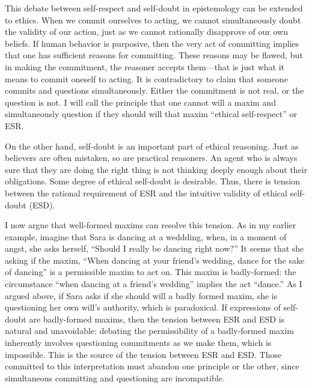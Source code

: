 \begin{isabellebody}
\begin{isamarkuptext}
This debate between self-respect and self-doubt in epistemology can be extended to ethics. When we 
commit ourselves to acting, we cannot simultaneously doubt the validity of our action, just as we cannot
rationally disapprove of our own beliefs. If human 
behavior is purposive, then the very act of committing implies that one has sufficient reasons for 
committing. These reasons may be flawed, but in making the commitment, the reasoner accepts them—that is 
just what it means to commit oneself to acting. It 
is contradictory to claim that someone commits and questions simultaneously. Either the commitment 
is not real, or the question is not. I will call the principle that one cannot will a maxim and 
simultaneously question if they should will that maxim ``ethical self-respect'' or ESR.

On the other hand, self-doubt is an important part of ethical reasoning. Just as believers are often 
mistaken, so are practical reasoners. An agent who is always sure that they are doing the right thing 
is not thinking deeply enough about their obligations. Some degree of ethical self-doubt is desirable. 
Thus, there is tension between the rational requirement of ESR and the intuitive validity of ethical 
self-doubt (ESD).

I now argue that well-formed maxims can resolve this tension. As in my earlier example, imagine that Sara is dancing at a 
weddding, when, in a moment of angst, she asks herself, ``Should I really be dancing right now?'' 
It seems that she asking if the maxim, ``When dancing at your friend's wedding, dance for the sake 
of dancing'' is a permissible maxim to act on. This maxim is badly-formed: the 
circumstance ``when dancing at a friend's wedding'' implies the act ``dance.'' As I argued above, if 
Sara asks if she should will a badly formed maxim, she is questioning her own will's authority, which
is paradoxical. If expressions of self-doubt are badly-formed maxims, then the tension between ESR
and ESD is natural and unavoidable: debating the permissibility of a badly-formed maxim inherently
involves questioning commitments as we make them, which is impossible. This is the source of the 
tension between ESR and ESD. Those committed to this 
interpretation must abandon one principle or the other, since simultaneous committing and questioning are incompatible.


\end{isamarkuptext}
\end{isabellebody}
